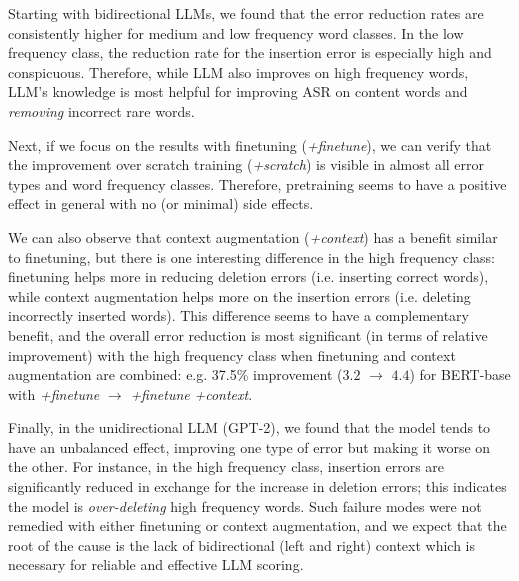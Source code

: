 \documentclass[a4paper]{article}
\begin{document}
Starting with bidirectional LLMs, we found that the error reduction rates are consistently higher for medium and low frequency word classes. In the low frequency class, the reduction rate for the insertion error is especially high and conspicuous. Therefore, while LLM also improves on high frequency words, LLM's knowledge is most helpful for improving ASR on content words and \textit{removing} incorrect rare words.

Next, if we focus on the results with finetuning (\textit{+finetune}), we can verify that the improvement over scratch training (\textit{+scratch}) is visible in almost all error types and word frequency classes. Therefore, pretraining seems to have a positive effect in general with no (or minimal) side effects.

We can also observe that context augmentation (\textit{+context}) has a benefit similar to finetuning, but there is one interesting difference in the high frequency class: finetuning helps more in reducing deletion errors (i.e. inserting correct words), while context augmentation helps more on the insertion errors (i.e. deleting incorrectly inserted words). This difference seems to have a complementary benefit, and the overall error reduction is most significant (in terms of relative improvement) with the high frequency class when finetuning and context augmentation are combined: e.g. 37.5\% improvement ($3.2$ $\rightarrow$ $4.4$) for BERT-base with \textit{+finetune} $\rightarrow$ \textit{+finetune} \textit{+context}.

Finally, in the unidirectional LLM (GPT-2), we found that the model tends to have an unbalanced effect, improving one type of error but making it worse on the other. For instance, in the high frequency class, insertion errors are significantly reduced in exchange for the increase in deletion errors; this indicates the model is \textit{over-deleting} high frequency words. Such failure modes were not remedied with either finetuning or context augmentation, and we expect that the root of the cause is the lack of bidirectional (left and right) context which is necessary for reliable and effective LLM scoring.




\end{document}
